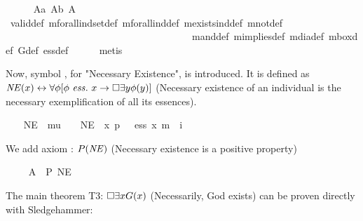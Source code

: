 \begin{isabellebody}
%
\isadelimproof
\ \ \ \ %
\endisadelimproof
%
\isatagproof
{}\isamarkupfalse%
\ A{}a\ A{}b\ A{}\ \isamarkupfalse%
\ valid{\isacharunderscore}def\ mforall{\isacharunderscore}indset{\isacharunderscore}def\ mforall{\isacharunderscore}ind{\isacharunderscore}def\ mexists{\isacharunderscore}ind{\isacharunderscore}def\ mnot{\isacharunderscore}def\isanewline
\ \ \ \ \ \ \ \ \ \ \ \ \ \ \ \ \ \ \ \ \ \ \ \ \ \ \ \ \ \ \ \ \ \ \ \ \ \ mand{\isacharunderscore}def\ mimplies{\isacharunderscore}def\ mdia{\isacharunderscore}def\ mbox{\isacharunderscore}def\ G{\isacharunderscore}def\ ess{\isacharunderscore}def\ \isanewline
\ \ \ \isamarkupfalse%
\ metis%
\endisatagproof
{\isafoldproof}%
%
\isadelimproof
%
\endisadelimproof
%
\begin{isamarkuptext}%
Now, symbol , for "Necessary Existence", is introduced. It is 
 defined as $\mathit{NE}(x) \leftrightarrow \forall \phi [\phi \ \mathit{ess.} \ x \rightarrow \Box \exists y \phi(y)]$ (Necessary 
 existence of an individual is the necessary exemplification of all its essences).%
\end{isamarkuptext}%
\isamarkuptrue%
\ \ \isamarkupfalse%
\ NE\ {\isacharcolon}{\isacharcolon}\ {\isachardoublequoteopen}mu\ {\isasymRightarrow}\ {\isasymsigma}{\isachardoublequoteclose}\ \ {\isachardoublequoteopen}NE\ {\isacharequal}\ {\isacharparenleft}{\isasymlambda}x{\isachardot}\ {\isasymforall}p\ {\isacharparenleft}{\isasymlambda}{\isasymPhi}{\isachardot}\ {\isasymPhi}\ ess\ x\ m{\isasymRightarrow}\ {\isasymbox}\ {\isacharparenleft}{\isasymexists}i\ {\isasymPhi}{\isacharparenright}{\isacharparenright}{\isacharparenright}{\isachardoublequoteclose}%
\begin{isamarkuptext}%
We add axiom : $P(\mathit{NE})$ (Necessary existence is a positive property)%
\end{isamarkuptext}%
\isamarkuptrue%
\ \ \isamarkupfalse%
\ \ A{}{\isacharcolon}\ \ {\isachardoublequoteopen}{\isacharbrackleft}P\ NE{\isacharbrackright}{\isachardoublequoteclose}%
\begin{isamarkuptext}%
The main theorem T3: $\Box \exists x G(x)$ (Necessarily, God exists) can be proven
 directly with Sledgehammer: 

\end{isamarkuptext}
\end{isabellebody}
